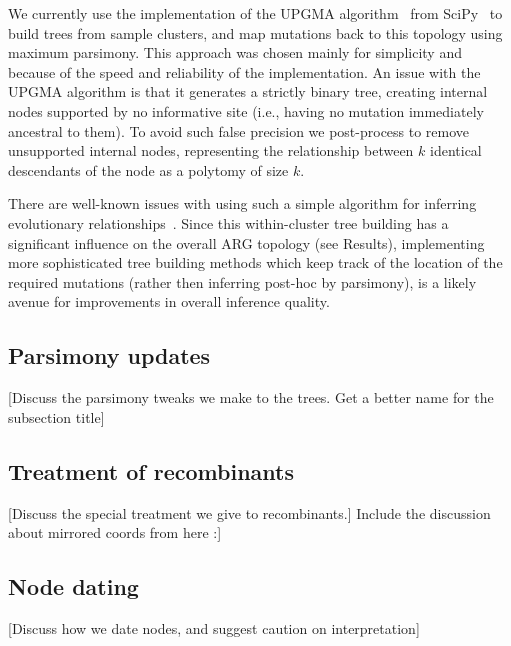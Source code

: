 \documentclass{article}
\begin{document}
We currently use the implementation of the UPGMA algorithm~\citep{Michener1957-tr}
from SciPy~\citep{Pauli2020-scipy} to build trees from sample
clusters, and map mutations back to this topology using maximum parsimony.
This approach was chosen mainly for simplicity and because of the
speed and reliability of the implementation.
An issue with the UPGMA algorithm is that it generates a strictly
binary tree, creating internal nodes
supported by no informative site (i.e., having no mutation immediately
ancestral to them). To avoid such false precision we post-process
to remove unsupported internal nodes, representing the relationship
between $k$ identical descendants of the node as a polytomy of size $k$.

There are well-known issues with using such a simple algorithm for inferring
evolutionary relationships~\citep{Felsenstein2004-inferring}.
Since this within-cluster tree building has a significant influence on the
overall ARG topology (see Results), implementing more sophisticated
tree building methods which keep track of the location of the required mutations
(rather then inferring post-hoc by parsimony), is a likely avenue
for improvements in overall inference quality.

\subsection{Parsimony updates}
[Discuss the parsimony tweaks we make to the trees. Get a better name
for the subsection title]

\subsection{Treatment of recombinants}
[Discuss the special treatment we give to recombinants.]
Include the discussion about mirrored coords from here :]

\subsection{Node dating}
[Discuss how we date nodes, and suggest caution on interpretation]

\end{document}
